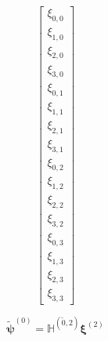 \documentclass[a4paper,10pt]{scrreprt}
\begin{document}
\begin{equation}
\begin{bmatrix}
        \xi_{0,0} \\
        \xi_{1,0} \\
        \xi_{2,0} \\
        \xi_{3,0} \\
        \xi_{0,1} \\
        \xi_{1,1} \\
        \xi_{2,1} \\
        \xi_{3,1} \\
        \xi_{0,2} \\
        \xi_{1,2} \\
        \xi_{2,2} \\
        \xi_{3,2} \\
        \xi_{0,3} \\
        \xi_{1,3} \\
        \xi_{2,3} \\
        \xi_{3,3}
    \end{bmatrix}
\end{equation}

\begin{equation}
    \mathbf{\tilde{\psi}}^{(0)} = \mathbb{H}^{(\tilde{0},2)} \mathbf{\xi}^{(2)}
\end{equation}
\end{document}
